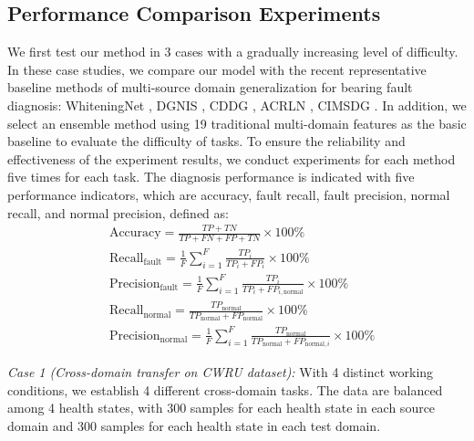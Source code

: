 \documentclass{article}
\begin{document}
	\subsection{Performance Comparison Experiments}
	We first test our method in 3 cases with a gradually increasing level of difficulty. In these case studies, we compare our model with the recent representative baseline methods of multi-source domain generalization for bearing fault diagnosis: WhiteningNet \cite{RN9}, DGNIS \cite{RN10}, CDDG \cite{RN11}, ACRLN \cite{RN12}, CIMSDG \cite{RN5}. In addition, we select an ensemble method using 19 traditional multi-domain features \cite{RN17} as the basic baseline to evaluate the difficulty of tasks. To ensure the reliability and effectiveness of the experiment results, we conduct experiments for each method five times for each task. The diagnosis performance is indicated with five performance indicators, which are accuracy, fault recall, fault precision, normal recall, and normal precision, defined as:
	\begin{align}
		&\text{Accuracy} = \frac{TP+TN}{TP+FN+FP+TN}\times100\% \\
		&\text{Recall}_{\text{fault}} = \frac{1}{F}\sum_{i=1}^{F}\frac{TP_{i}}{TP_{i}+FP_{i}}\times100\% \\
		&\text{Precision}_{\text{fault}} = \frac{1}{F}\sum_{i=1}^{F}\frac{TP_{i}}{TP_{i}+FP_{i,\text{normal}}}\times100\% \\
		&\text{Recall}_{\text{normal}} = \frac{TP_{\text{normal}}}{TP_{\text{normal}}+FP_{\text{normal}}}\times100\% \\
		&\text{Precision}_{\text{normal}} = \frac{1}{F}\sum_{i=1}^{F}\frac{TP_{\text{normal}}}{TP_{\text{normal}}+FP_{\text{normal},i}}\times100\%
	\end{align}
	
	\textit{Case 1 (Cross-domain transfer on CWRU dataset):} With 4 distinct working conditions, we establish 4 different cross-domain tasks. The data are balanced among 4 health states, with 300 samples for each health state in each source domain and 300 samples for each health state in each test domain.
	
\end{document}
